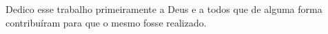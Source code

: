 \begin{dedicatoria}
  \vspace*{\fill}
  \hspace{0.2\textwidth}
  \begin{minipage}{0.8\textwidth}
 Dedico esse trabalho primeiramente a Deus e a todos que de alguma forma contribuíram  para que o mesmo fosse realizado.
  \end{minipage}
\end{dedicatoria}
